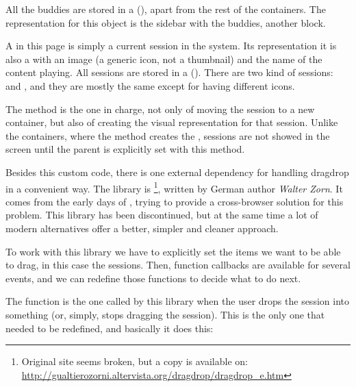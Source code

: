 All the buddies are stored in a  (), apart from the rest of the containers.
The  representation for this object is the sidebar with the buddies, another  block.

A  in this page is simply a current session in the system.
Its  representation it is also a  with an image (a generic icon, not a thumbnail) and the name of the content playing.
All sessions are stored in a  ().
There are two kind of sessions:  and , and they are mostly the same except for having different icons.

The  method is the one in charge, not only of moving the session to a new container, but also of creating the visual representation for that session.
Unlike the containers, where the  method creates the , sessions are not showed in the screen until the parent is explicitly set with this  method.

Besides this custom code, there is one external dependency for handling drag\et{}drop in a convenient way.
The library is \footnote{Original site seems broken, but a copy is available on:\\ \url{http://gualtierozorni.altervista.org/dragdrop/dragdrop_e.htm}}, written by German author \emph{Walter Zorn}.
It comes from the early days of , trying to provide a cross-browser solution for this problem.
This library has been discontinued, but at the same time a lot of modern alternatives offer a better, simpler and cleaner approach.

To work with this library we have to explicitly set the items we want to be able to drag, in this case the sessions.
Then, function callbacks are available for several events, and we can redefine those functions to decide what to do next.

The  function is the one called by this library when the user drops the session into something (or, simply, stops dragging the session).
This is the only one that needed to be redefined, and basically it does this:

